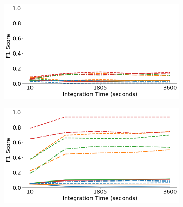 \begin{figure}[H]
     \centering
     \begin{subfigure}[b]{0.49\textwidth}
         \centering
         \includegraphics[width=\textwidth]{images/generalization-cal-aug-easy-01.png}
         \caption{}
         \label{fig:generalization-cal-aug-easy-01}
     \end{subfigure}
     \hfill
     \begin{subfigure}[b]{0.49\textwidth}
         \centering
         \includegraphics[width=\textwidth]{images/generalization-cal-aug-easy-05.png}
         \caption{}
         \label{fig:generalization-cal-aug-easy-05}
     \end{subfigure}


\end{figure}
